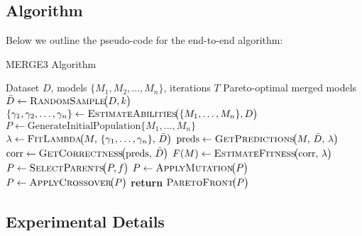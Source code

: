 \subsection{\approachbf{} Algorithm}
% 
Below we outline the pseudo-code for the end-to-end \approach{} algorithm:
%
\begin{algorithm}[ht]
    \caption{MERGE3 Algorithm} \label{alg:merge3}
    \begin{algorithmic}[1]
    \REQUIRE Dataset $D$, models $\lbrace M_1, M_2, \ldots, M_n \rbrace$, iterations $T$
    \ENSURE Pareto-optimal merged models
        \STATE $\bar{D} \gets \textsc{RandomSample}\!\bigl(D, k\bigr)$
        \STATE $\lbrace \gamma_1,\gamma_2,\ldots,\gamma_n \rbrace \gets \textsc{EstimateAbilities}\!\bigl(\{M_1, \ldots, M_n\}, D\bigr)$
        \STATE $P \gets \text{GenerateInitialPopulation}{\{M_1, \ldots, M_n\}}$
                \STATE $\lambda \gets \textsc{FitLambda}\!\bigl(M,\,\lbrace \gamma_1,\dots,\gamma_n \rbrace,\,\bar{D}\bigr)$
                \STATE $\text{preds} \gets \textsc{GetPredictions}\!\bigl(M,\,\bar{D},\,\lambda\bigr)$
                \STATE $\text{corr} \gets \textsc{GetCorrectness}\!\bigl(\text{preds},\,\bar{D}\bigr)$
                \STATE $F(M) \gets \textsc{EstimateFitness}\!\bigl(\text{corr},\,\lambda\bigr)$
            \ENDFOR
            \STATE $P \gets \textsc{SelectParents}\!\bigl(P, f\bigr)$ 
            \STATE $P \gets \textsc{ApplyMutation}\!\bigl(P\bigr)$
            \STATE $P \gets \textsc{ApplyCrossover}\!\bigl(P\bigr)$
        \ENDFOR
        \STATE \textbf{return} $\textsc{ParetoFront}\!\bigl(P\bigr)$
    \end{algorithmic}
\end{algorithm}

\subsection{Experimental Details}
\label{app:add-details-evo}

